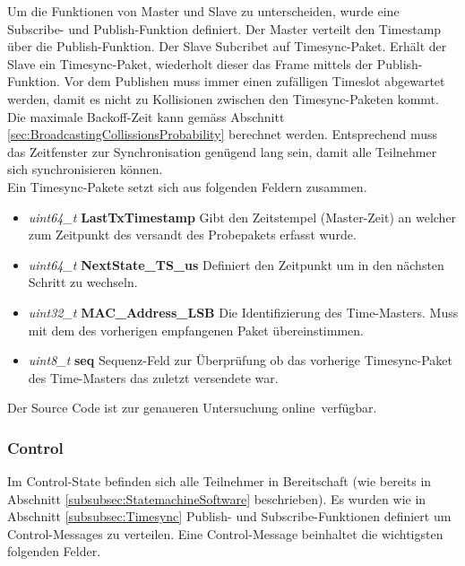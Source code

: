 Um die Funktionen von Master und Slave zu unterscheiden, wurde eine Subscribe- und Publish-Funktion definiert. Der Master verteilt den Timestamp über die Publish-Funktion. Der Slave Subcribet auf Timesync-Paket. Erhält der Slave ein Timesync-Paket, wiederholt dieser das Frame mittels der Publish-Funktion. Vor dem Publishen muss immer einen zufälligen Timeslot abgewartet werden, damit es nicht zu Kollisionen zwischen den Timesync-Paketen kommt. Die maximale Backoff-Zeit kann gemäss Abschnitt \ref{sec:BroadcastingCollissionsProbability} berechnet werden. Entsprechend muss das Zeitfenster zur Synchronisation genügend lang sein, damit alle Teilnehmer sich synchronisieren können.\\

Ein Timesync-Pakete setzt sich aus folgenden Feldern zusammen. 

\begin{itemize}
	\item \textit{uint64\_t} \textbf{LastTxTimestamp} Gibt den Zeitstempel (Master-Zeit) an welcher zum Zeitpunkt des versandt des Probepakets erfasst wurde. \\
	\item \textit{uint64\_t} \textbf{NextState\_TS\_us} Definiert den Zeitpunkt um in den nächsten Schritt zu wechseln.\\
	\item \textit{uint32\_t} \textbf{MAC\_Address\_LSB} Die Identifizierung des Time-Masters. Muss mit dem des vorherigen empfangenen Paket übereinstimmen. \\
	\item \textit{uint8\_t} \textbf{seq} Sequenz-Feld zur Überprüfung ob das vorherige Timesync-Paket des Time-Masters das zuletzt versendete war. \\
\end{itemize}

Der Source Code ist zur genaueren Untersuchung online\footnotemark\ verfügbar. 


\subsubsection{Control}\label{subsubsec:Control}

Im Control-State befinden sich alle Teilnehmer in Bereitschaft (wie bereits in Abschnitt \ref{subsubsec:StatemachineSoftware} beschrieben). Es wurden wie in Abschnitt \ref{subsubsec:Timesync} Publish- und Subscribe-Funktionen definiert um Control-Messages zu verteilen. Eine Control-Message beinhaltet die wichtigsten folgenden Felder.

